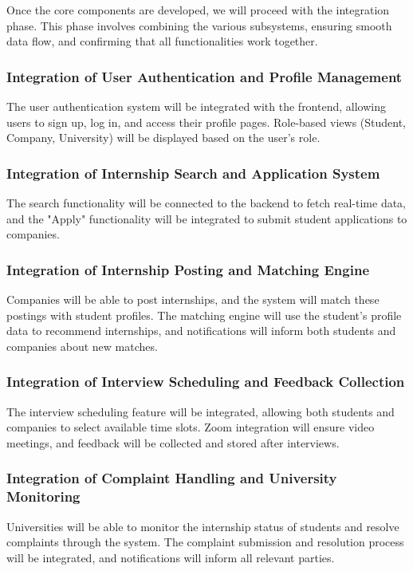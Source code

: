 Once the core components are developed, we will proceed with the integration phase. This phase involves combining the various subsystems, ensuring smooth data flow, and confirming that all functionalities work together.

\subsubsection{Integration of User Authentication and Profile Management}
The user authentication system will be integrated with the frontend, allowing users to sign up, log in, and access their profile pages. Role-based views (Student, Company, University) will be displayed based on the user’s role.

\subsubsection{Integration of Internship Search and Application System}
The search functionality will be connected to the backend to fetch real-time data, and the "Apply" functionality will be integrated to submit student applications to companies.

\subsubsection{Integration of Internship Posting and Matching Engine}
Companies will be able to post internships, and the system will match these postings with student profiles. The matching engine will use the student’s profile data to recommend internships, and notifications will inform both students and companies about new matches.

\subsubsection{Integration of Interview Scheduling and Feedback Collection}
The interview scheduling feature will be integrated, allowing both students and companies to select available time slots. Zoom integration will ensure video meetings, and feedback will be collected and stored after interviews.

\subsubsection{Integration of Complaint Handling and University Monitoring}
Universities will be able to monitor the internship status of students and resolve complaints through the system. The complaint submission and resolution process will be integrated, and notifications will inform all relevant parties.

